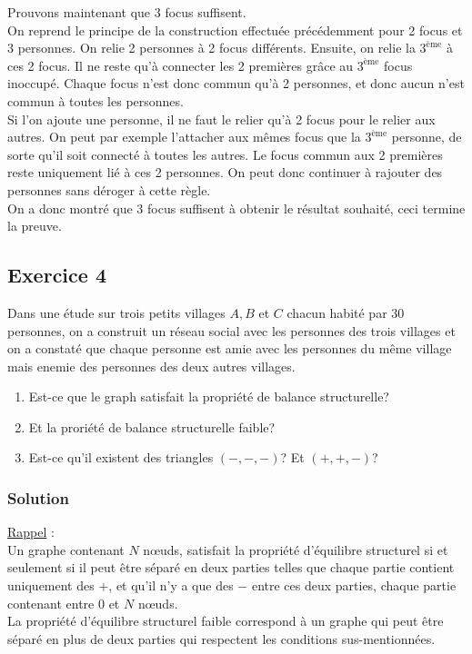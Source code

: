     Prouvons maintenant que 3 focus suffisent.\\
    On reprend le principe de la construction effectuée précédemment pour 2 focus et 3 personnes.
    On relie 2 personnes à 2 focus différents.
    Ensuite, on relie la $3^{\text{ème}}$ à ces 2 focus.
    Il ne reste qu'à connecter les 2 premières grâce au $3^{\text{ème}}$ focus inoccupé.
    Chaque focus n'est donc commun qu'à 2 personnes, et donc aucun n'est commun à toutes les personnes.\\
    Si l'on ajoute une personne, il ne faut le relier qu'à 2 focus pour le relier aux autres.
    On peut par exemple l'attacher aux mêmes focus que la $3^{\text{ème}}$ personne, de sorte qu'il soit connecté à toutes les autres.
    Le focus commun aux 2 premières reste uniquement lié à ces 2 personnes.
    On peut donc continuer à rajouter des personnes sans déroger à cette règle.\\
    On a donc montré que 3 focus suffisent à obtenir le résultat souhaité, ceci termine la preuve.


\subsection*{Exercice 4}
Dans une \'{e}tude sur trois petits villages $A, B$ et $C$ chacun habit\'{e} par 30 personnes, on a construit un r\'{e}seau social avec les personnes des trois villages et on a
constat\'{e} que chaque personne est amie avec les personnes du m\^{e}me village mais enemie des personnes des deux autres villages.
\begin{enumerate}
\item Est-ce que le graph satisfait la propri\'{e}t\'{e} de balance structurelle?
\item Et la prori\'{e}t\'{e} de balance structurelle faible?
\item Est-ce qu'il existent des triangles $(-,-,-)$? Et $(+,+,-)$?
\end{enumerate}

    \subsubsection*{Solution}
    \noindent \underline{Rappel} :\\
    Un graphe contenant $N$ n\oe{}uds, satisfait la propriété d'équilibre structurel si et seulement si il peut être séparé en deux parties telles que chaque partie contient uniquement des $+$, et qu'il n'y a que des $-$ entre ces deux parties, chaque partie contenant entre $0$ et $N$ n\oe{}uds.\\
    La propriété d'équilibre structurel faible correspond à un graphe qui peut être séparé en plus de deux parties qui respectent les conditions sus-mentionnées.

